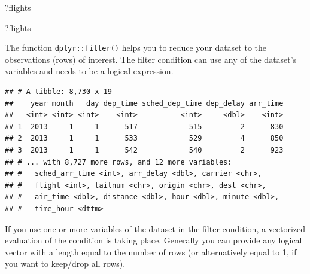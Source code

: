 \documentclass[]{book}
\newenvironment{Shaded}{}{}
\newcommand{\DecValTok}[1]{#1}
\newcommand{\KeywordTok}[1]{\textcolor[rgb]{0.00,0.00,1.00}{#1}}
\newcommand{\NormalTok}[1]{#1}
\newcommand{\OperatorTok}[1]{#1}
\newcommand{\StringTok}[1]{\textcolor[rgb]{0.00,0.50,0.50}{#1}}
\begin{document}
\begin{Shaded}
\begin{Highlighting}[]
\NormalTok{?flights}
\end{Highlighting}
\end{Shaded}

\begin{Shaded}
\begin{Highlighting}[]
\NormalTok{?flights}
\end{Highlighting}
\end{Shaded}

The function \texttt{dplyr::filter()} helps you to reduce your dataset to the observations (rows) of interest.
The filter condition can use any of the dataset's variables and needs to be a logical expression.

\begin{Shaded}
\end{Shaded}

\begin{verbatim}
## # A tibble: 8,730 x 19
##    year month   day dep_time sched_dep_time dep_delay arr_time
##   <int> <int> <int>    <int>          <int>     <dbl>    <int>
## 1  2013     1     1      517            515         2      830
## 2  2013     1     1      533            529         4      850
## 3  2013     1     1      542            540         2      923
## # ... with 8,727 more rows, and 12 more variables:
## #   sched_arr_time <int>, arr_delay <dbl>, carrier <chr>,
## #   flight <int>, tailnum <chr>, origin <chr>, dest <chr>,
## #   air_time <dbl>, distance <dbl>, hour <dbl>, minute <dbl>,
## #   time_hour <dttm>
\end{verbatim}

If you use one or more variables of the dataset in the filter condition, a vectorized evaluation of the condition is taking place.
Generally you can provide any logical vector with a length equal to the number of rows (or alternatively equal to 1, if you want to keep/drop all rows).

\begin{Shaded}
\end{Shaded}
\end{document}
